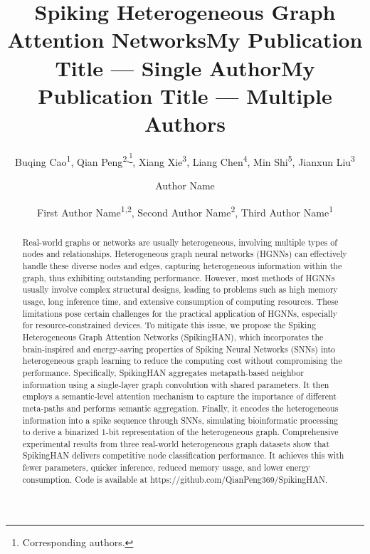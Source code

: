 \documentclass[letterpaper]{article} %
\title{Spiking Heterogeneous Graph Attention Networks}
\author{
    Buqing Cao\textsuperscript{{\rm 1}},
    Qian Peng\textsuperscript{{\rm 2},\thanks{Corresponding authors.}},
    Xiang Xie\textsuperscript{\rm 3},
    Liang Chen\textsuperscript{\rm 4},
    Min Shi\textsuperscript{\rm 5},
    Jianxun Liu\textsuperscript{\rm 3}\\
}
\title{My Publication Title --- Single Author}
\author {
    Author Name
}
\title{My Publication Title --- Multiple Authors}
\author {
    First Author Name\textsuperscript{\rm 1,\rm 2},
    Second Author Name\textsuperscript{\rm 2},
    Third Author Name\textsuperscript{\rm 1}
}
\begin{document}
\maketitle

\begin{abstract}
Real-world graphs or networks are usually heterogeneous, involving multiple types of nodes and relationships. Heterogeneous graph neural networks (HGNNs) can effectively handle these diverse nodes and edges, capturing heterogeneous information within the graph, thus exhibiting outstanding performance. However, most methods of HGNNs usually involve complex structural designs, leading to problems such as high memory usage, long inference time, and extensive consumption of computing resources. These limitations pose certain challenges for the practical application of HGNNs, especially for resource-constrained devices. To mitigate this issue, we propose the Spiking Heterogeneous Graph Attention Networks (SpikingHAN), which incorporates the brain-inspired and energy-saving properties of Spiking Neural Networks (SNNs) into heterogeneous graph learning to reduce the computing cost without compromising the performance. Specifically, SpikingHAN aggregates metapath-based neighbor information using a single-layer graph convolution with shared parameters. It then employs a semantic-level attention mechanism to capture the importance of different meta-paths and performs semantic aggregation. Finally, it encodes the heterogeneous information into a spike sequence through SNNs, simulating bioinformatic processing to derive a binarized 1-bit representation of the heterogeneous graph. Comprehensive experimental results from three real-world heterogeneous graph datasets show that SpikingHAN delivers competitive node classification performance. It achieves this with fewer parameters, quicker inference, reduced memory usage, and lower energy consumption. Code is available at https://github.com/QianPeng369/SpikingHAN. 
\end{abstract}

\end{document}
